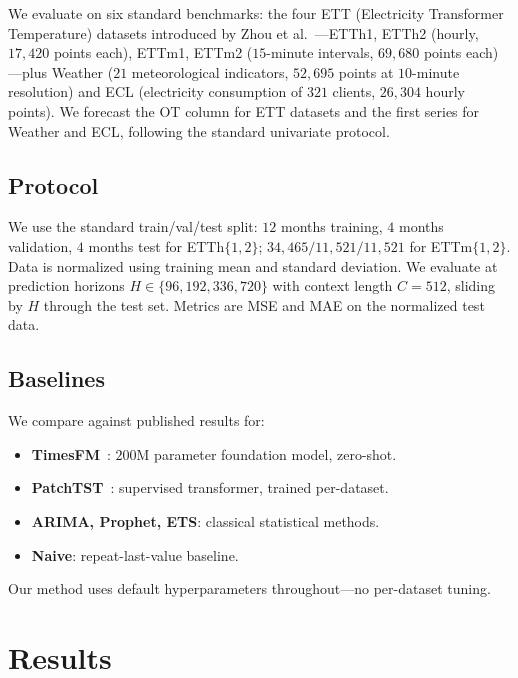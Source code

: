 \documentclass[sigconf,nonacm]{acmart}
\begin{document}
We evaluate on six standard benchmarks: the four ETT (Electricity Transformer Temperature) datasets introduced by Zhou et al.~\cite{zhou2021}---ETTh1, ETTh2 (hourly, $17{,}420$ points each), ETTm1, ETTm2 ($15$-minute intervals, $69{,}680$ points each)---plus Weather ($21$ meteorological indicators, $52{,}695$ points at $10$-minute resolution) and ECL (electricity consumption of $321$ clients, $26{,}304$ hourly points). We forecast the OT column for ETT datasets and the first series for Weather and ECL, following the standard univariate protocol.

\subsection{Protocol}

We use the standard train/val/test split: $12$ months training, $4$ months validation, $4$ months test for ETTh$\{1,2\}$; $34{,}465/11{,}521/11{,}521$ for ETTm$\{1,2\}$. Data is normalized using training mean and standard deviation. We evaluate at prediction horizons $H \in \{96, 192, 336, 720\}$ with context length $C = 512$, sliding by $H$ through the test set. Metrics are MSE and MAE on the normalized test data.

\subsection{Baselines}

We compare against published results for:
\begin{itemize}
\item \textbf{TimesFM}~\cite{das2024}: $200$M parameter foundation model, zero-shot.
\item \textbf{PatchTST}~\cite{nie2023}: supervised transformer, trained per-dataset.
\item \textbf{ARIMA, Prophet, ETS}: classical statistical methods.
\item \textbf{Naive}: repeat-last-value baseline.
\end{itemize}

Our method uses default hyperparameters throughout---no per-dataset tuning.

\section{Results}
\end{document}
